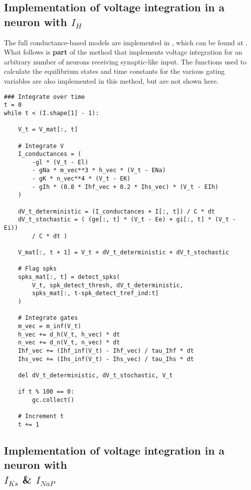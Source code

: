 \documentclass[12pt]{article}
\begin{document}
\subsection{Implementation of voltage integration in a neuron with $I_H$}

The full conductance-based models are implemented in , which can be found at .
What follows is \textbf{part} of the  method that implements voltage integration for an arbitrary number of neurons receiving synaptic-like input.
The functions used to calculate the equilibrium states and time constants for the various gating variables are also implemented in this method, but are not shown here.

\begin{verbatim}
### Integrate over time
t = 0
while t < (I.shape[1] - 1):

    V_t = V_mat[:, t]

    # Integrate V
    I_conductances = (
        -gl * (V_t - El)
        - gNa * m_vec**3 * h_vec * (V_t - ENa)
        - gK * n_vec**4 * (V_t - EK)
        - gIh * (0.8 * Ihf_vec + 0.2 * Ihs_vec) * (V_t - EIh)
    )

    dV_t_deterministic = (I_conductances + I[:, t]) / C * dt
    dV_t_stochastic = ( (ge[:, t] * (V_t - Ee) + gi[:, t] * (V_t - Ei))
        / C * dt )

    V_mat[:, t + 1] = V_t + dV_t_deterministic + dV_t_stochastic

    # Flag spks
    spks_mat[:, t] = detect_spks(
        V_t, spk_detect_thresh, dV_t_deterministic,
        spks_mat[:, t-spk_detect_tref_ind:t]
    )

    # Integrate gates
    m_vec = m_inf(V_t)
    h_vec += d_h(V_t, h_vec) * dt
    n_vec += d_n(V_t, n_vec) * dt
    Ihf_vec += (Ihf_inf(V_t) - Ihf_vec) / tau_Ihf * dt
    Ihs_vec += (Ihs_inf(V_t) - Ihs_vec) / tau_Ihs * dt

    del dV_t_deterministic, dV_t_stochastic, V_t

    if t % 100 == 0:
        gc.collect()

    # Increment t
    t += 1
\end{verbatim}


\subsection{Implementation of voltage integration in a neuron with \\$I_{Ks}$ \& $I_{NaP}$}
\end{document}
